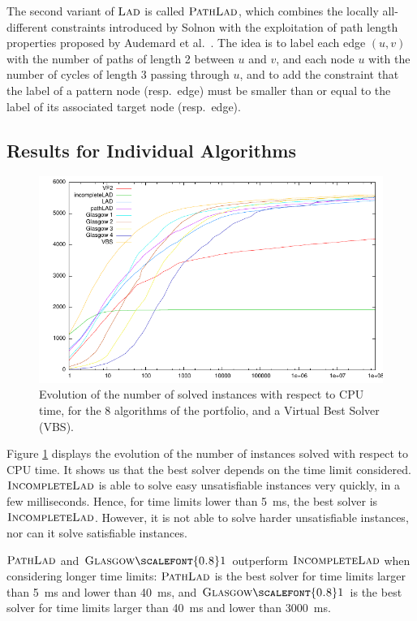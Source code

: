 \documentclass{llncs}
\newcommand{\LAD}{$\textsc{Lad}$\xspace}
\newcommand{\IncompleteLAD}{$\textsc{IncompleteLad}$\xspace}
\newcommand{\PathLAD}{$\textsc{PathLad}$\xspace}
\newcommand{\GlasgowOne}{$\textsc{Glasgow{\scalefont{0.8}1}}$\xspace}
\begin{document}
The second variant of \LAD is called \PathLAD, which combines the locally all-different constraints
introduced by Solnon \cite{Solnon:2010} with the exploitation of path length properties proposed by
Audemard et al.\ \cite{Audemard:2014}. The idea is to label each edge $(u,v)$ with the number of
paths of length 2 between $u$ and $v$, and each node $u$ with the number of cycles of length 3
passing through $u$, and to add the constraint that the label of a pattern node (resp.\ edge) must
be smaller than or equal to the label of its associated target node (resp.\ edge).

\subsection{Results for Individual Algorithms} \label{expComp}

\begin{figure}[t]
\includegraphics[width=\textwidth]{courbe.pdf}
\caption{Evolution of the number of solved instances with respect to CPU time, for the 8 algorithms
of the portfolio, and a Virtual Best Solver (VBS).\label{expTimeGraph}}
\end{figure}

Figure \ref{expTimeGraph} displays the evolution of the number of instances solved with respect to
CPU time. It shows us that the best solver depends on the time limit considered. \IncompleteLAD is
able to solve easy unsatisfiable instances very quickly, in a few milliseconds. Hence, for time
limits lower than \SI{5}{\ms}, the best solver is \IncompleteLAD. However, it is not able to solve harder
unsatisfiable instances, nor can it solve satisfiable instances.

\PathLAD and \GlasgowOne outperform \IncompleteLAD when considering longer time limits: \PathLAD is the
best solver for time limits larger than \SI{5}{\ms} and lower than \SI{40}{\ms}, and \GlasgowOne is the best solver
for time limits larger than \SI{40}{\ms} and lower than \SI{3000}{\ms}.
\end{document}

